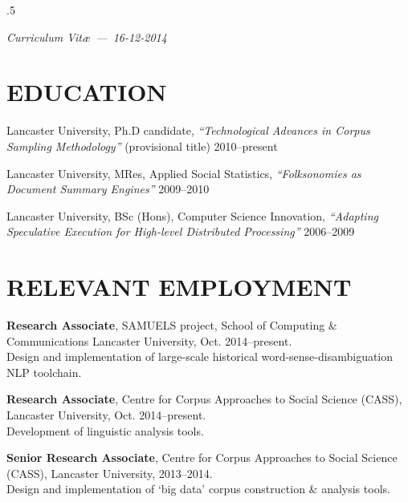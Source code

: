 \documentclass{res}
\begin{document}
\thispagestyle{empty} %
\address{\\
\texttt{<steve@stephenwattam.com>}\\
\texttt{http://stephenwattam.com/}}


\begin{resume}
\vspace{0.2in}
\moveleft.5\sectionwidth\centerline{\it Curriculum Vit\ae~---~16-12-2014}

\section{EDUCATION}
\vspace{0.1in}

    Lancaster University, Ph.D candidate,
    \textit{``Technological Advances in Corpus Sampling Methodology''} (provisional title)
    2010--present

    Lancaster University, MRes,
    Applied Social Statistics,
    \textit{``Folksonomies as Document Summary \mbox{Engines}''}
    2009--2010

    Lancaster University, BSc (Hons),
    Computer Science Innovation,
    \textit{``Adapting Speculative Execution for High-level Distributed Processing''}
    2006--2009



\section{RELEVANT EMPLOYMENT}
\vspace{0.1in}


    {\bf Research Associate},
    SAMUELS project, School of Computing \& Communications
    Lancaster University,
    Oct. 2014--present.\\
    Design and implementation of large-scale historical word-sense-disambiguation NLP toolchain.


    {\bf Research Associate},
    Centre for Corpus Approaches to Social Science (CASS),
    Lancaster University,
    Oct. 2014--present.\\
    Development of linguistic analysis tools.




    {\bf Senior Research Associate},
    Centre for Corpus Approaches to Social Science (CASS),
    Lancaster University,
    2013--2014.\\
    Design and implementation of `big data' corpus construction \& analysis tools.


\end{resume}
\end{document}
